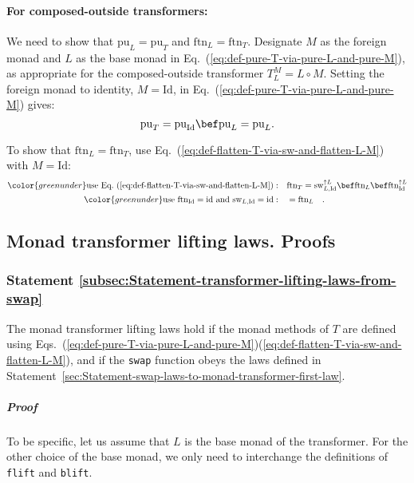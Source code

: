 \paragraph{For composed-outside transformers:}

We need to show that $\text{pu}_{L}=\text{pu}_{T}$ and $\text{ftn}_{L}=\text{ftn}_{T}$.
Designate $M$ as the foreign monad and $L$ as the base monad in
Eq.~(\ref{eq:def-pure-T-via-pure-L-and-pure-M}), as appropriate
for the composed-outside transformer $T_{L}^{M}=L\circ M$. Setting
the foreign monad to identity, $M=\text{Id}$, in Eq.~(\ref{eq:def-pure-T-via-pure-L-and-pure-M})
gives:
\[
\text{pu}_{T}=\text{pu}_{\text{Id}}\bef\text{pu}_{L}=\text{pu}_{L}.
\]

To show that $\text{ftn}_{L}=\text{ftn}_{T}$, use Eq.~(\ref{eq:def-flatten-T-via-sw-and-flatten-L-M})
with $M=\text{Id}$:
\begin{align*}
{\color{greenunder}\text{use Eq.~(\ref{eq:def-flatten-T-via-sw-and-flatten-L-M})}:}\quad & \text{ftn}_{T}=\text{sw}_{L,\text{Id}}^{\uparrow L}\bef\text{ftn}_{L}\bef\text{ftn}_{\text{Id}}^{\uparrow L}\\
{\color{greenunder}\text{use }\text{ftn}_{\text{Id}}=\text{id}\text{ and }\text{sw}_{L,\text{Id}}=\text{id}:}\quad & =\text{ftn}_{L}\quad.
\end{align*}


\subsection{Monad transformer lifting laws. Proofs}

\subsubsection{Statement \label{subsec:Statement-transformer-lifting-laws-from-swap}\ref{subsec:Statement-transformer-lifting-laws-from-swap}}

The monad transformer lifting laws hold if the monad methods of $T$
are defined using Eqs.~(\ref{eq:def-pure-T-via-pure-L-and-pure-M})\textendash (\ref{eq:def-flatten-T-via-sw-and-flatten-L-M}),
and if the \lstinline!swap! function obeys the laws defined in Statement~\ref{sec:Statement-swap-laws-to-monad-transformer-first-law}.

\subparagraph{Proof}

To be specific, let us assume that $L$ is the base monad of the transformer.
For the other choice of the base monad, we only need to interchange
the definitions of \lstinline!flift! and \lstinline!blift!.

